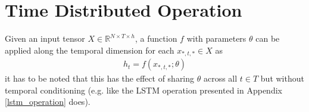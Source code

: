 \section{Time Distributed Operation}
Given an input tensor $X \in \mathbb{R}^{N \times T \times h}$, a function $f$ with parameters $\theta$ can be applied along the temporal dimension for each $x_{*,t,*} \in X$ as
\begin{gather}
    \label{time_distributed}
    h_t = f(x_{*,t,*}; \theta)
\end{gather}
it has to be noted that this has the effect of sharing $\theta$ across all $t \in T$ but without temporal conditioning (e.g. like the LSTM operation presented in Appendix \ref{lstm_operation} does).

